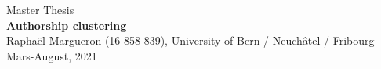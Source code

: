 \documentclass[twocolumn]{article}
\theoremstyle{definition}
\begin{document}
\date{}
\author{Raphaël Margueron}

\begin{titlepage}
\begin{center}
{\large Master Thesis}
\\[0.5cm]
{\LARGE \textbf{Authorship clustering}}
\\[0.5cm]
{\large Raphaël Margueron (16-858-839), University of Bern / Neuchâtel / Fribourg}
\\[0.5cm]
{\large Mars-August, 2021}
\\[0.5cm]
\end{center}

\tableofcontents
\end{titlepage}









\clearpage

\clearpage

\end{document}
